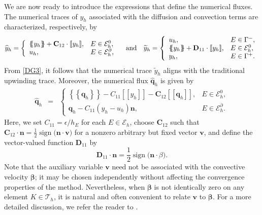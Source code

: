 \documentclass[a4paper,10pt]{article}
\newcommand {\average}[1] {\mbox{$\left\{\!\!\left\{ #1 \right\}\!\!\right\}$}}
\newcommand {\jump}[1] {\mbox{$\left[\!\left[ #1 \right]\!\right]$}}
\DeclareMathOperator{\sign}{sign}
\newcommand{\cE}{{\mathcal{E}}}
\newcommand{\bq}{{\mathbf{q}}}
\newcommand{\bn}{{\mathbf{n}}}
\numberwithin{theorem}{section}
\newcommand{\x}[2][blue]{#2}
\begin{document}
We are now ready to introduce the expressions that define the numerical fluxes. The numerical traces of $y_h$ associated with the diffusion and convection terms are characterized, respectively, by
\begin{equation}\label{DG3}
\widehat{y}_h = \left\{
                  \begin{array}{ll}
                    \average{y_h} + \mathbf{C}_{12} \cdot \jump{y_h}, & E \in \cE^{0}_h, \\
                    u_h, & E \in \cE^{\partial}_h,
                  \end{array}
                \right.
\quad \hbox{and} \quad
\widetilde{y}_h =\left\{
                 \begin{array}{ll}
                   u_h, & E \in \Gamma^{-}, \\
                   \average{y_h} + \mathbf{D}_{11} \cdot \jump{y_h}, & E \in \cE^{0}_h, \\
                   y_h, & E \in \Gamma^+.
                 \end{array}
               \right.
\end{equation}
From \eqref{DG3}, it follows that the numerical trace $\widetilde{y}_h$ aligns with the traditional upwinding trace. Moreover, the numerical flux  $\widehat{\bq}_h $ is given by
\begin{eqnarray}\label{DG4}
\widehat{\bq}_h &=& \left\{
                  \begin{array}{ll}
                    \average{\bq_h} - C_{11}\jump{y_h} - \mathbf{C}_{12} \jump{\bq_h}, & E \in \cE^{0}_h, \\
                    \bq_h  - C_{11} (y_h -u_h) \bn, & E \in \cE^{\partial}_h.
                  \end{array}
                \right.
\end{eqnarray}
Here, we set $C_{11} = \epsilon/h_E$ for each $E \in \cE_h$,  choose $\mathbf{C}_{12}$ such that $\mathbf{C}_{12} \cdot \bn = \frac{1}{2} \sign \big( \bn \cdot \mathbf v \big)$ for a nonzero arbitrary \x{but fixed} vector $\mathbf{v}$, and define the vector-valued function $\mathbf{D}_{11}$ by
\[
\mathbf{D}_{11} \cdot \bn = \frac{1}{2} \sign \big( \bn \cdot \beta \big).
\]
\x{Note that the auxiliary variable $\mathbf{v}$ need not be associated with the convective velocity $\boldsymbol{\beta}$; it may be chosen independently without affecting the 
convergence properties of the method. Nevertheless, when $\boldsymbol{\beta}$ is not 
identically zero on any element $K \in \mathcal{T}_h$, it is natural and often convenient 
to relate $\mathbf{v}$ to $\boldsymbol{\beta}$.} For a more detailed discussion, we refer the reader to \cite{PCastillo_BCockburn_IPergugia_DSchotzau_2000,BCockburn_JGopalakrishnan_FJSayas_2010,BCockburn_GKanschat_DSchotzau_2004a,ZZhou_XYu_NYan_2014a}.
\end{document}
